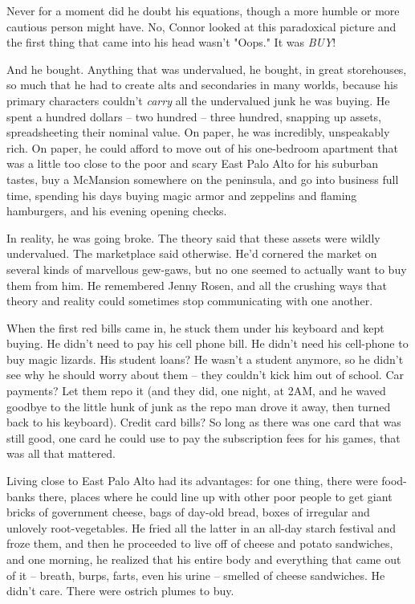 Never for a moment did he doubt his equations, though a more humble
or more cautious person might have. No, Connor looked at this
paradoxical picture and the first thing that came into his head
wasn't "Oops." It was \emph{BUY}!

And he bought. Anything that was undervalued, he bought, in great
storehouses, so much that he had to create alts and secondaries in
many worlds, because his primary characters couldn't \emph{carry}
all the undervalued junk he was buying. He spent a hundred dollars
-- two hundred -- three hundred, snapping up assets, spreadsheeting
their nominal value. On paper, he was incredibly, unspeakably rich.
On paper, he could afford to move out of his one-bedroom apartment
that was a little too close to the poor and scary East Palo Alto
for his suburban tastes, buy a McMansion somewhere on the
peninsula, and go into business full time, spending his days buying
magic armor and zeppelins and flaming hamburgers, and his evening
opening checks.

In reality, he was going broke. The theory said that these assets
were wildly undervalued. The marketplace said otherwise. He'd
cornered the market on several kinds of marvellous gew-gaws, but no
one seemed to actually want to buy them from him. He remembered
Jenny Rosen, and all the crushing ways that theory and reality
could sometimes stop communicating with one another.

When the first red bills came in, he stuck them under his keyboard
and kept buying. He didn't need to pay his cell phone bill. He
didn't need his cell-phone to buy magic lizards. His student loans?
He wasn't a student anymore, so he didn't see why he should worry
about them -- they couldn't kick him out of school. Car payments?
Let them repo it (and they did, one night, at 2AM, and he waved
goodbye to the little hunk of junk as the repo man drove it away,
then turned back to his keyboard). Credit card bills? So long as
there was one card that was still good, one card he could use to
pay the subscription fees for his games, that was all that
mattered.

Living close to East Palo Alto had its advantages: for one thing,
there were food-banks there, places where he could line up with
other poor people to get giant bricks of government cheese, bags of
day-old bread, boxes of irregular and unlovely root-vegetables. He
fried all the latter in an all-day starch festival and froze them,
and then he proceeded to live off of cheese and potato sandwiches,
and one morning, he realized that his entire body and everything
that came out of it -- breath, burps, farts, even his urine --
smelled of cheese sandwiches. He didn't care. There were ostrich
plumes to buy.

